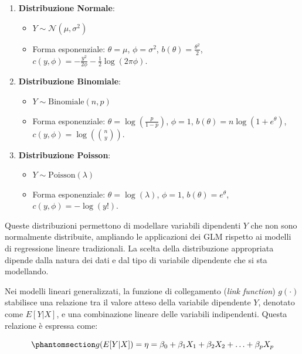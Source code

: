 \documentclass[
  italian,
  a4paper,
  a4paper,
  twoside,
  open=right,
  12pt]{scrbook}
\providecommand{\tightlist}{%
  \setlength{\itemsep}{0pt}\setlength{\parskip}{0pt}}
\theoremstyle{definition}
\theoremstyle{remark}
\begin{document}
\begin{enumerate}
\def\labelenumi{\arabic{enumi}.}
\tightlist
\item
  \textbf{Distribuzione Normale}:

  \begin{itemize}
  \tightlist
  \item
    \(Y \sim \mathcal{N}(\mu, \sigma^2)\)
  \item
    Forma esponenziale: \(\theta = \mu\), \(\phi = \sigma^2\),
    \(b(\theta) = \frac{\theta^2}{2}\),
    \(c(y, \phi) = -\frac{y^2}{2\phi} - \frac{1}{2}\log(2\pi\phi)\).
  \end{itemize}
\item
  \textbf{Distribuzione Binomiale}:

  \begin{itemize}
  \tightlist
  \item
    \(Y \sim \text{Binomiale}(n, p)\)
  \item
    Forma esponenziale: \(\theta = \log\left(\frac{p}{1-p}\right)\),
    \(\phi = 1\), \(b(\theta) = n \log(1 + e^\theta)\),
    \(c(y, \phi) = \log\left(\binom{n}{y}\right)\).
  \end{itemize}
\item
  \textbf{Distribuzione Poisson}:

  \begin{itemize}
  \tightlist
  \item
    \(Y \sim \text{Poisson}(\lambda)\)
  \item
    Forma esponenziale: \(\theta = \log(\lambda)\), \(\phi = 1\),
    \(b(\theta) = e^\theta\), \(c(y, \phi) = -\log(y!)\).
  \end{itemize}
\end{enumerate}

Queste distribuzioni permettono di modellare variabili dipendenti \(Y\)
che non sono normalmente distribuite, ampliando le applicazioni dei GLM
rispetto ai modelli di regressione lineare tradizionali. La scelta della
distribuzione appropriata dipende dalla natura dei dati e dal tipo di
variabile dipendente che si sta modellando.

Nei modelli lineari generalizzati, la funzione di collegamento
(\emph{link function}) \(g(\cdot)\) stabilisce una relazione tra il
valore atteso della variabile dipendente \(Y\), denotato come
\(E[Y|X]\), e una combinazione lineare delle variabili indipendenti.
Questa relazione è espressa come:

\begin{equation}\phantomsection\label{eq-linearity_eta}{
g(E[Y|X]) = \eta = \beta_0 + \beta_1 X_1 + \beta_2 X_2 + \ldots + \beta_p X_p
}\end{equation}
\end{document}
